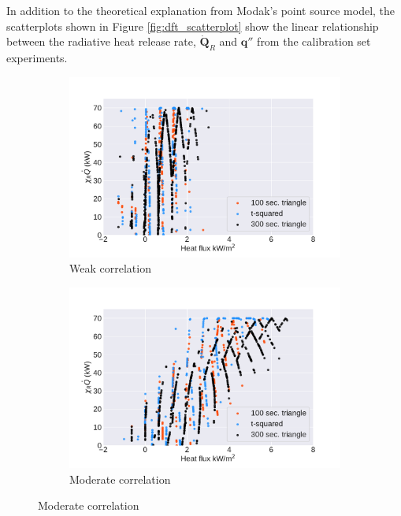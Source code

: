 \documentclass{article}
\begin{document}
In addition to the theoretical explanation from Modak's point source model, the scatterplots shown in Figure \ref{fig:dft_scatterplot} show the linear relationship between the radiative heat release rate, $\boldsymbol{\dot{Q}}_{R}$ and $\boldsymbol{q}''$ from the calibration set experiments. 

\begin{figure}[htbp]
  \centering
  \begin{subfigure}[t]{.45\textwidth}
      \centering
      \includegraphics[width=\textwidth,keepaspectratio]{figures/weak_dft_scatter.pdf}
      \caption{Weak correlation}
      \label{fig:weak_scatter}
  \end{subfigure}
  \begin{subfigure}[t]{.45\textwidth}
      \centering
      \includegraphics[width=\textwidth ,keepaspectratio]{figures/moderate_dft_scatter.pdf}
      \caption{Moderate correlation}

\end{subfigure}
\end{figure}
\end{document}
